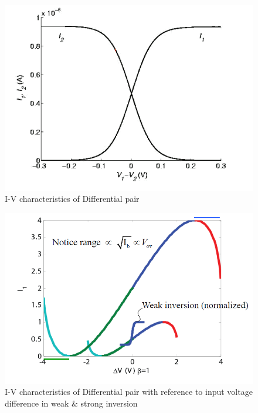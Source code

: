 \documentclass[main]{subfiles}
\begin{document}
 \begin{figure}[htbp]
  \centering
  \includegraphics[scale=0.6]{figs/I-V_characteristics_of_Differential_pair.png}
  \caption{I-V characteristics of Differential pair}
  \label{fig:I-V_characteristics_of_Differential_pair}
\end{figure}




\begin{figure}[htbp]
  \centering
  \includegraphics[scale=0.6]{figs/Differential_pair_in_weak_strong_inversion.png}
  \caption{I-V characteristics of Differential pair with reference to input voltage difference in weak $\&$ strong inversion}
  \label{fig:Differential_pair_in_weak_strong_inversion}
\end{figure}
\end{document}
